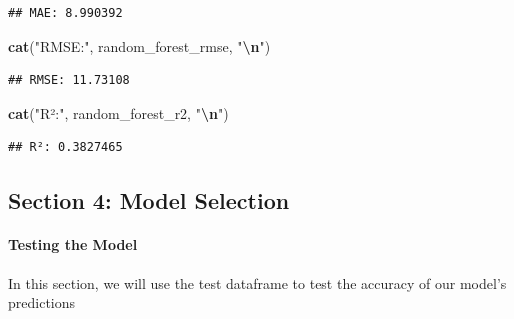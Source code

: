 \documentclass[
]{article}
\newenvironment{Shaded}{\begin{snugshade}}{\end{snugshade}}
\newcommand{\FunctionTok}[1]{\textcolor[rgb]{0.13,0.29,0.53}{\textbf{#1}}}
\newcommand{\NormalTok}[1]{#1}
\newcommand{\SpecialCharTok}[1]{\textcolor[rgb]{0.81,0.36,0.00}{\textbf{#1}}}
\newcommand{\StringTok}[1]{\textcolor[rgb]{0.31,0.60,0.02}{#1}}
\begin{document}
\begin{verbatim}
## MAE: 8.990392
\end{verbatim}

\begin{Shaded}
\begin{Highlighting}[]
\FunctionTok{cat}\NormalTok{(}\StringTok{"RMSE:"}\NormalTok{, random\_forest\_rmse, }\StringTok{"}\SpecialCharTok{\textbackslash{}n}\StringTok{"}\NormalTok{)}
\end{Highlighting}
\end{Shaded}

\begin{verbatim}
## RMSE: 11.73108
\end{verbatim}

\begin{Shaded}
\begin{Highlighting}[]
\FunctionTok{cat}\NormalTok{(}\StringTok{"R²:"}\NormalTok{, random\_forest\_r2, }\StringTok{"}\SpecialCharTok{\textbackslash{}n}\StringTok{"}\NormalTok{)}
\end{Highlighting}
\end{Shaded}

\begin{verbatim}
## R²: 0.3827465
\end{verbatim}

\subsection{Section 4: Model Selection}\label{section-4-model-selection}

\paragraph{Testing the Model}\label{testing-the-model}

In this section, we will use the test dataframe to test the accuracy of
our model's predictions
\end{document}
